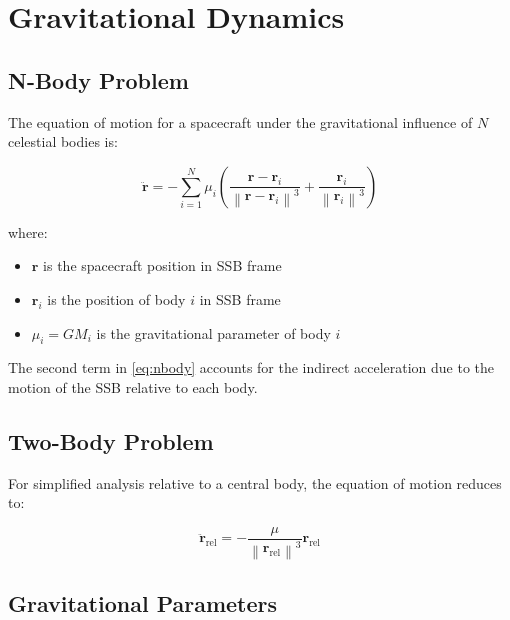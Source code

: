 \documentclass[11pt,a4paper]{article}
\newcommand{\vect}[1]{\bm{#1}}
\newcommand{\norm}[1]{\left\lVert #1 \right\rVert}
\begin{document}
\section{Gravitational Dynamics}

\subsection{N-Body Problem}

The equation of motion for a spacecraft under the gravitational influence of $N$ celestial bodies is:

\begin{equation}
    \ddot{\vect{r}} = -\sum_{i=1}^{N} \mu_i \left( \frac{\vect{r} - \vect{r}_i}{\norm{\vect{r} - \vect{r}_i}^3} + \frac{\vect{r}_i}{\norm{\vect{r}_i}^3} \right)
    \label{eq:nbody}
\end{equation}

where:
\begin{itemize}
    \item $\vect{r}$ is the spacecraft position in SSB frame
    \item $\vect{r}_i$ is the position of body $i$ in SSB frame
    \item $\mu_i = GM_i$ is the gravitational parameter of body $i$
\end{itemize}

The second term in \cref{eq:nbody} accounts for the indirect acceleration due to the motion of the SSB relative to each body.

\subsection{Two-Body Problem}

For simplified analysis relative to a central body, the equation of motion reduces to:

\begin{equation}
    \ddot{\vect{r}}_\text{rel} = -\frac{\mu}{\norm{\vect{r}_\text{rel}}^3} \vect{r}_\text{rel}
    \label{eq:twobody}
\end{equation}

\subsection{Gravitational Parameters}
\end{document}
